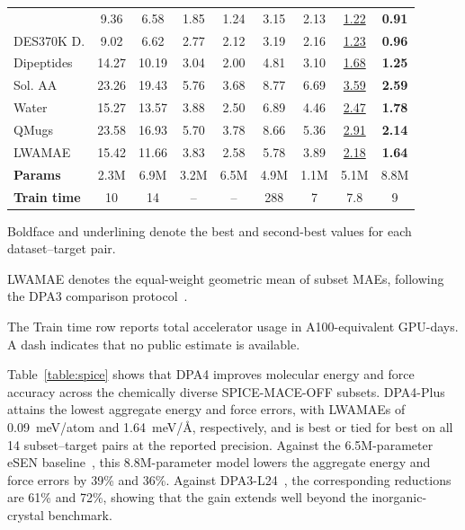 \begin{table}[tp]
\begin{threeparttable}
\begin{tabular*}{\linewidth}{@{\extracolsep{\fill}} l *{8}{c} @{}}
            & 9.36  & 6.58  & 1.85 & 1.24 & 3.15 & 2.13 & \underline{1.22} & \textbf{0.91} \\
            DES370K D.      & 9.02  & 6.62  & 2.77 & 2.12 & 3.19 & 2.16 & \underline{1.23} & \textbf{0.96} \\
            Dipeptides      & 14.27 & 10.19 & 3.04 & 2.00 & 4.81 & 3.10 & \underline{1.68} & \textbf{1.25} \\
            Sol. AA         & 23.26 & 19.43 & 5.76 & 3.68 & 8.77 & 6.69 & \underline{3.59} & \textbf{2.59} \\
            Water           & 15.27 & 13.57 & 3.88 & 2.50 & 6.89 & 4.46 & \underline{2.47} & \textbf{1.78} \\
            QMugs           & 23.58 & 16.93 & 5.70 & 3.78 & 8.66 & 5.36 & \underline{2.91} & \textbf{2.14} \\
            LWAMAE\tnote{a} & 15.42 & 11.66 & 3.83 & 2.58 & 5.78 & 3.89 & \underline{2.18} & \textbf{1.64} \\
            \midrule
            \textbf{Params}                  & 2.3M & 6.9M & 3.2M & 6.5M & 4.9M & 1.1M & 5.1M & 8.8M \\
            \textbf{Train time}\tnote{b}       & 10   & 14   & --   & --   & 288  & 7    & 7.8  & 9 \\
            \bottomrule
        \end{tabular*}
        \begin{tablenotes}[flushleft]
            \PaperTableNotesStyle
            \item[] Boldface and underlining denote the best and second-best values for each dataset--target pair.
            \item[a] LWAMAE denotes the equal-weight geometric mean of subset MAEs, following the DPA3 comparison protocol~\cite{zhang2025dpa3}.
            \item[b] The Train time row reports total accelerator usage in A100-equivalent GPU-days.
            A dash indicates that no public estimate is available.
        \end{tablenotes}
    \end{threeparttable}
\end{table}

Table~\ref{table:spice} shows that DPA4 improves molecular energy and force accuracy across the chemically diverse SPICE-MACE-OFF subsets.
DPA4-Plus attains the lowest aggregate energy and force errors, with LWAMAEs of 0.09~meV/atom and 1.64~meV/\AA{}, respectively, and is best or tied for best on all 14 subset--target pairs at the reported precision.
Against the 6.5M-parameter eSEN baseline~\cite{fu2025esen}, this 8.8M-parameter model lowers the aggregate energy and force errors by 39\% and 36\%.
Against DPA3-L24~\cite{zhang2025dpa3}, the corresponding reductions are 61\% and 72\%, showing that the gain extends well beyond the inorganic-crystal benchmark.

